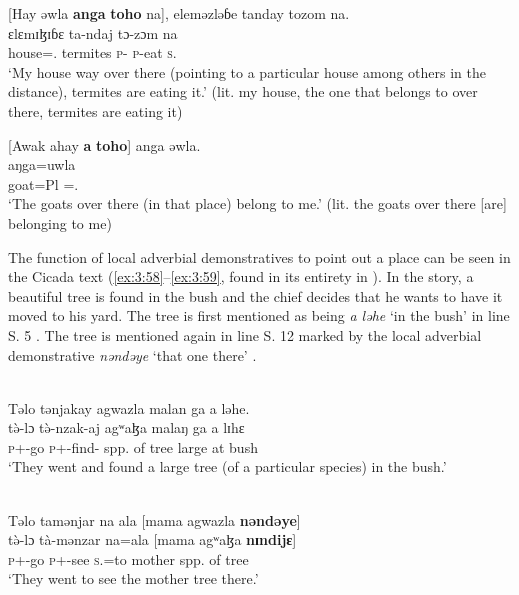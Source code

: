 \ea \label{ex:3:56}
[Hay  əwla  \textbf{anga} \textbf{toho} na],  eleməzləɓe  tanday  tozom  na.\\
\gll  [haj=uwla             \textbf{aŋga} \textbf{tɔhʷɔ}  na]     ɛlɛmɪɮɪɓɛ  ta-ndaj                             tɔ-zɔm  na\\
      house={\oneS}.{\POSS}  {\POSS}       {\DEM}                            {\PSP}  termites   \textsc{p}-{\PROG}  \textsc{p}-eat  \textsc{s}.{\DO}\\
\glt  ‘My house way over there (pointing to a particular house among others in the distance), termites are eating it.’ (lit. my house, the one that belongs to over there, termites are eating it)
\z

\clearpage
\ea \label{ex:3:57}
[Awak  ahay  \textbf{a}  \textbf{toho}]  anga  əwla.\\
\gll  [awak=ahaj  \textbf{a}  \textbf{tɔhʷɔ}]  aŋga=uwla\\
      goat=Pl  {\GEN}  {\DEM}  {\POSS}={\oneS}.{\POSS}\\
\glt  ‘The goats over there (in that place) belong to me.’ (lit. the goats over there [are] belonging to me)
\z

The function of local adverbial demonstratives to point out a place can be seen in the Cicada text (\ref{ex:3:58}--\ref{ex:3:59}, found in its entirety in ). In the story, a beautiful tree is found in the bush and the chief decides that he wants to have it moved to his yard. The tree is first mentioned as being \textit{a ləhe} ‘in the bush’ in line S. 5 . The tree is mentioned again in line S. 12 marked by the local adverbial demonstrative \textit{nəndəye}\textit{ }‘that one there’ . 


\ea \label{ex:3:58}\\
Təlo  tənjakay  agwazla  malan  ga  a  ləhe.\\
\gll  t\`{ə}-lɔ            t\`{ə}-nzak-aj           agʷaɮa    malaŋ     ga   a  lɪhɛ\\
      \textsc{p}+{\PFV}-go   \textsc{p}+{\PFV}-find-{\CL}  {spp. of tree}  large    {\ADJ}  at  bush\\
\glt  ‘They went and found a large tree (of a particular species) in the bush.’
\z

\ea \label{ex:3:59}\\
Təlo  tamənjar  na            ala           [mama  agwazla  \textbf{nəndəye}]\\
\gll  t\`{ə}-lɔ tà-mənzar     na=ala     [mama  agʷaɮa    \textbf{nɪndijɛ}]\\
      \textsc{p}+{\PFV}-go    \textsc{p}+{\HOR}-see  \textsc{s}.{\DO}=to  mother  {spp. of tree}  {\DEM}\\
\glt  ‘They went to see the mother tree there.’
\z

